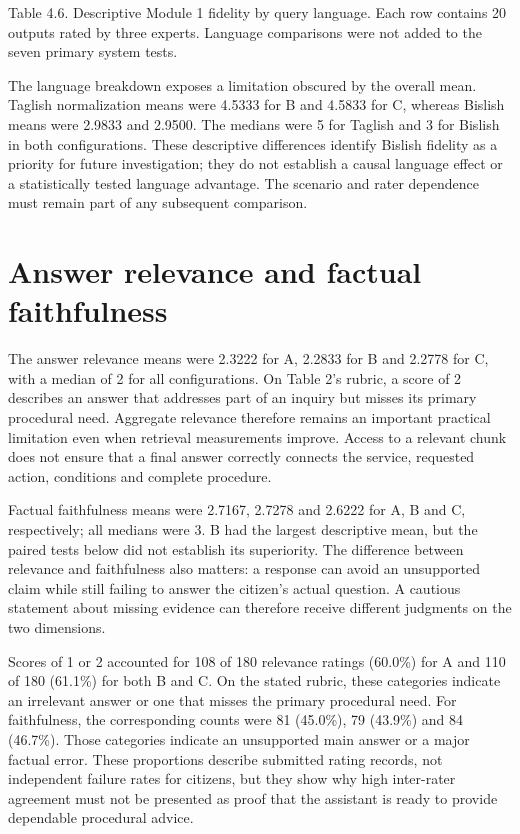 Table 4.6. Descriptive Module 1 fidelity by query language. Each row contains 20 outputs rated by three experts. Language comparisons were not added to the seven primary system tests.


The language breakdown exposes a limitation obscured by the overall mean. Taglish normalization means were 4.5333 for B and 4.5833 for C, whereas Bislish means were 2.9833 and 2.9500. The medians were 5 for Taglish and 3 for Bislish in both configurations. These descriptive differences identify Bislish fidelity as a priority for future investigation; they do not establish a causal language effect or a statistically tested language advantage. The scenario and rater dependence must remain part of any subsequent comparison.


\section{Answer relevance and factual faithfulness}

The answer relevance means were 2.3222 for A, 2.2833 for B and 2.2778 for C, with a median of 2 for all configurations. On Table 2's rubric, a score of 2 describes an answer that addresses part of an inquiry but misses its primary procedural need. Aggregate relevance therefore remains an important practical limitation even when retrieval measurements improve. Access to a relevant chunk does not ensure that a final answer correctly connects the service, requested action, conditions and complete procedure.


Factual faithfulness means were 2.7167, 2.7278 and 2.6222 for A, B and C, respectively; all medians were 3. B had the largest descriptive mean, but the paired tests below did not establish its superiority. The difference between relevance and faithfulness also matters: a response can avoid an unsupported claim while still failing to answer the citizen's actual question. A cautious statement about missing evidence can therefore receive different judgments on the two dimensions.


Scores of 1 or 2 accounted for 108 of 180 relevance ratings (60.0\%) for A and 110 of 180 (61.1\%) for both B and C. On the stated rubric, these categories indicate an irrelevant answer or one that misses the primary procedural need. For faithfulness, the corresponding counts were 81 (45.0\%), 79 (43.9\%) and 84 (46.7\%). Those categories indicate an unsupported main answer or a major factual error. These proportions describe submitted rating records, not independent failure rates for citizens, but they show why high inter-rater agreement must not be presented as proof that the assistant is ready to provide dependable procedural advice.



